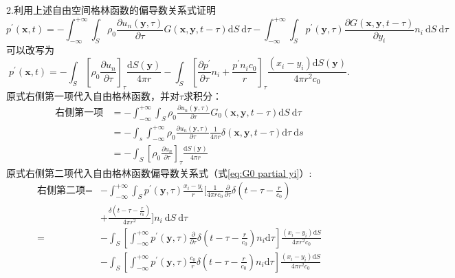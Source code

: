 \clearpage

\noindent 2.利用上述自由空间格林函数的偏导数关系式证明
$$
p^{\prime}(\mathbf{x}, t)=-\int_{-\infty}^{+\infty} \int_{S} \rho_{0} \frac{\partial u_{n}(\mathbf{y}, \tau)}{\partial \tau} G(\mathbf{x}, \mathbf{y}, t-\tau) \mathrm{d} S \mathrm{~d} \tau-\int_{-\infty}^{+\infty} \int_{S} p^{\prime}(\mathbf{y}, \tau) \frac{\partial G(\mathbf{x}, \mathbf{y}, t-\tau)}{\partial y_{i}} n_{i} \mathrm{~d} S \mathrm{~d} \tau
$$
可以改写为
$$
p^{\prime}(\mathbf{x}, t)=-\int_{S}\left[\rho_{0} \frac{\partial u_{n}}{\partial \tau}\right]_{\tau} \frac{\mathrm{d} S(\mathbf{y})}{4 \pi r}-\int_{S}\left[\frac{\partial p^{\prime}}{\partial \tau} n_{i}+\frac{p^{\prime} n_{i} c_{0}}{r}\right]_{\tau} \frac{\left(x_{i}-y_{i}\right) \mathrm{d} S(\mathbf{y})}{4 \pi r^{2} c_{0}}.
$$
原式右侧第一项代入自由格林函数，并对$\tau$求积分：
\begin{equation}
    \label{eq:right first final}
    \begin{aligned}
        \mbox{右侧第一项} &= -\int_{-\infty}^{+\infty} \int_{S} \rho_{0} \frac{\partial u_{n}(\mathbf{y}, \tau)}{\partial \tau} G_{0}(\mathbf{x}, \mathbf{y}, t-\tau) \mathrm{d} S \mathrm{~d} \tau \\
        &= -\int_{s} \int_{-\infty}^{+\infty} \rho_{0} \frac{\partial u_{n}(\mathbf{y}, \tau)}{\partial \tau} \frac{1}{4 \pi r} \delta(\mathbf{x}, \mathbf{y}, t-\tau) \mathrm{d} \tau \mathrm{~d} s \\
        &= -\int_{S}\left[\rho_{0} \frac{\partial u_{n}}{\partial \tau}\right]_{\tau} \frac{\mathrm{d} S(\mathbf{y})}{4 \pi r}
    \end{aligned}
\end{equation}
原式右侧第二项代入自由格林函数偏导数关系式（式\eqref{eq:G0 partial yi}）:
\begin{equation}
    \label{eq:second}
    \begin{aligned}
        \mbox{右侧第二项} =& -\int_{-\infty}^{+\infty} \int_{S} p^{\prime}(\mathbf{y}, \tau) 
        \frac{x_{i}-y_{i}}{r} [\frac{1}{4 \pi r c_{0}} \frac{\partial}{\partial \tau} \delta\left(t-\tau-\frac{r}{c_{0}} \right) \\
        &+\frac{\delta\left(t-\tau-\frac{r}{c_{0}}\right)}{4 \pi r^{2}}]
        n_{i} \mathrm{~d} S \mathrm{~d} \tau \\
        =& -\int_S \left[ \int_{-\infty}^{+\infty} p^{\prime}(\mathbf{y}, \tau) \frac{\partial}{\partial \tau} \delta\left(t-\tau-\frac{r}{c_{0}} \right) n_i \mathrm{d} \tau\right]  \frac{\left( x_{i}-y_{i} \right) \mathrm{d} S}{4 \pi r^2 c_{0}} \\
        &-\int_S \left[ \int_{-\infty}^{+\infty} p^{\prime}(\mathbf{y}, \tau) \frac{c_0}{r} \delta\left(t-\tau-\frac{r}{c_{0}} \right) n_i \mathrm{d} \tau\right]  \frac{\left( x_{i}-y_{i} \right) \mathrm{d} S}{4 \pi r^2 c_{0}}
    \end{aligned}
\end{equation}
